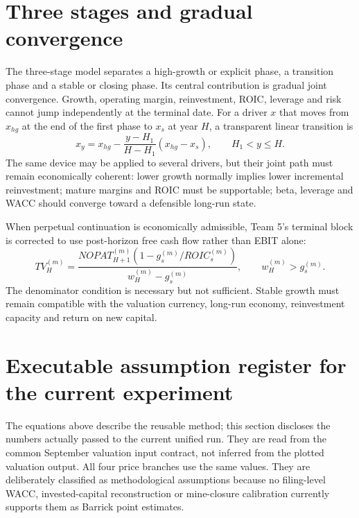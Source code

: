 \section{Three stages and gradual convergence}

The three-stage model separates a high-growth or explicit phase, a transition
phase and a stable or closing phase. Its central contribution is gradual joint
convergence. Growth, operating margin, reinvestment, ROIC, leverage and risk
cannot jump independently at the terminal date. For a driver \(x\) that moves
from \(x_{hg}\) at the end of the first phase to \(x_s\) at year \(H\), a
transparent linear transition is
\begin{equation}
x_y=x_{hg}-\frac{y-H_1}{H-H_1}(x_{hg}-x_s),
\qquad H_1<y\leq H.
\end{equation}
The same device may be applied to several drivers, but their joint path must
remain economically coherent: lower growth normally implies lower incremental
reinvestment; mature margins and ROIC must be supportable; beta, leverage and
WACC should converge toward a defensible long-run state.

When perpetual continuation is economically admissible, Team 5's terminal
block is corrected to use post-horizon free cash flow rather than EBIT alone:
\begin{equation}
TV_H^{(m)}=
\frac{NOPAT_{H+1}^{(m)}
\left(1-g_s^{(m)}/ROIC_s^{(m)}\right)}
{w_H^{(m)}-g_s^{(m)}},
\qquad w_H^{(m)}>g_s^{(m)}.
\end{equation}
The denominator condition is necessary but not sufficient. Stable growth must
remain compatible with the valuation currency, long-run economy, reinvestment
capacity and return on new capital.

\section{Executable assumption register for the current experiment}
\label{sec:executable-valuation-assumptions}

The equations above describe the reusable method; this section discloses the
numbers actually passed to the current unified run. They are read from
the common September valuation input contract, not inferred
from the plotted valuation output. All four price branches use the same values.
They are deliberately classified as methodological assumptions because no
filing-level WACC, invested-capital reconstruction or mine-closure calibration
currently supports them as Barrick point estimates.

